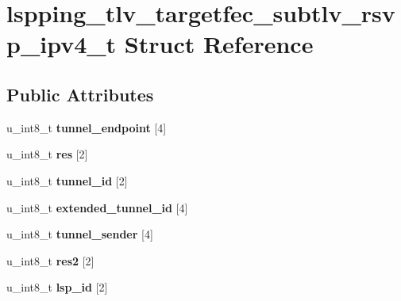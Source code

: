 \hypertarget{structlspping__tlv__targetfec__subtlv__rsvp__ipv4__t}{
\section{lspping\_\-tlv\_\-targetfec\_\-subtlv\_\-rsvp\_\-ipv4\_\-t Struct Reference}
\label{structlspping__tlv__targetfec__subtlv__rsvp__ipv4__t}
}
\subsection*{Public Attributes}
\begin{DoxyCompactItemize}
\item 
\hypertarget{structlspping__tlv__targetfec__subtlv__rsvp__ipv4__t_af481fae4ae5754e7cedb88398cf187c6}{
u\_\-int8\_\-t {\bfseries tunnel\_\-endpoint} \mbox{[}4\mbox{]}}
\label{structlspping__tlv__targetfec__subtlv__rsvp__ipv4__t_af481fae4ae5754e7cedb88398cf187c6}

\item 
\hypertarget{structlspping__tlv__targetfec__subtlv__rsvp__ipv4__t_a6cc98e522f714a4b141e2ef84b1bf450}{
u\_\-int8\_\-t {\bfseries res} \mbox{[}2\mbox{]}}
\label{structlspping__tlv__targetfec__subtlv__rsvp__ipv4__t_a6cc98e522f714a4b141e2ef84b1bf450}

\item 
\hypertarget{structlspping__tlv__targetfec__subtlv__rsvp__ipv4__t_a7f2fdad59a67c589144a1107167670a8}{
u\_\-int8\_\-t {\bfseries tunnel\_\-id} \mbox{[}2\mbox{]}}
\label{structlspping__tlv__targetfec__subtlv__rsvp__ipv4__t_a7f2fdad59a67c589144a1107167670a8}

\item 
\hypertarget{structlspping__tlv__targetfec__subtlv__rsvp__ipv4__t_a14d647c1873646c36c1e528dcf0bf5b7}{
u\_\-int8\_\-t {\bfseries extended\_\-tunnel\_\-id} \mbox{[}4\mbox{]}}
\label{structlspping__tlv__targetfec__subtlv__rsvp__ipv4__t_a14d647c1873646c36c1e528dcf0bf5b7}

\item 
\hypertarget{structlspping__tlv__targetfec__subtlv__rsvp__ipv4__t_a56209ff0d61f0be1e781f2fae8bcce41}{
u\_\-int8\_\-t {\bfseries tunnel\_\-sender} \mbox{[}4\mbox{]}}
\label{structlspping__tlv__targetfec__subtlv__rsvp__ipv4__t_a56209ff0d61f0be1e781f2fae8bcce41}

\item 
\hypertarget{structlspping__tlv__targetfec__subtlv__rsvp__ipv4__t_afd4a186470aa91ef1fa52ab2563be646}{
u\_\-int8\_\-t {\bfseries res2} \mbox{[}2\mbox{]}}
\label{structlspping__tlv__targetfec__subtlv__rsvp__ipv4__t_afd4a186470aa91ef1fa52ab2563be646}

\item 
\hypertarget{structlspping__tlv__targetfec__subtlv__rsvp__ipv4__t_abb12388eb50af100810b500dbe948341}{
u\_\-int8\_\-t {\bfseries lsp\_\-id} \mbox{[}2\mbox{]}}
\label{structlspping__tlv__targetfec__subtlv__rsvp__ipv4__t_abb12388eb50af100810b500dbe948341}

\end{DoxyCompactItemize}


